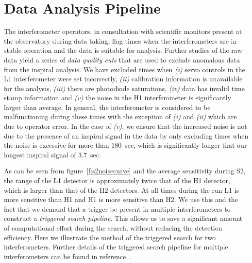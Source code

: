 \section{Data Analysis Pipeline}
\label{s:pipeline}

The interferometer operators, in consultation with scientific monitors present
at the observatory during data taking, flag times when the interferometers are
in stable operation and the data is suitable for analysis.  Further studies of
the raw data yield a series of \emph{data quality cuts} that are used to
exclude anomalous data from the inspiral analysis\cite{gwdawveto}. We have
excluded times when \emph{(i)} servo controls in the L1 interferometer were
set incorrectly, \emph{(ii)} calibration information is unavailable for the
analysis, \emph{(iii)} there are photodiode saturations, \emph{(iv)} data has
invalid time stamp information and \emph{(v)} the noise in the H1
interferometer is significantly larger than average. In general, the
interferometer is considered to be malfunctioning during these times with the
exception of \emph{(i)} and \emph{(ii)} which are due to operator error. In
the case of \emph{(v)}, we ensure that the increased noise is not due to the
presence of an inspiral signal in the data by only excluding times when the
noise is excessive for more than $180$~sec, which is significantly longer that
our longest inspiral signal of $3.7$~sec.

As can be seen from figure~\ref{f:s2noisecurve} and the average sensitivity
during S2, the range of the L1 detector is approximately twice that of the H1
detector, which is larger than that of the H2 detectors. At all times during
the run L1 is more sensitive than H1 and H1 is more sensitive than H2. We use
this and the fact that we demand that a trigger be present in multiple
interferometers to construct a \emph{triggered search pipeline}. This allows
us to save a significant amount of computational effort during the search,
without reducing the detection efficiency. Here we illustrate the method of
the triggered search for two interferometers. Further details of the triggered
search pipeline for multiple interferometers can be found in
reference~\cite{abbott2004a}.


